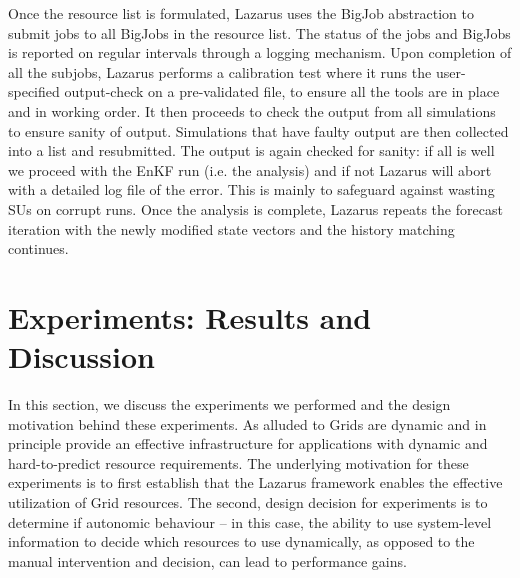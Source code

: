 \documentclass[conference,final]{IEEEtran}
\begin{document}
Once the resource list is formulated, Lazarus uses the BigJob
abstraction to submit jobs to all BigJobs in the resource list. The
status of the jobs and BigJobs is reported on regular intervals
through a logging mechanism. Upon completion of all the subjobs,
Lazarus performs a calibration test where it runs the user-specified
output-check on a pre-validated file, to ensure all the tools are in
place and in working order. It then proceeds to check the output from
all simulations to ensure sanity of output. Simulations that have
faulty output are then collected into a list and resubmitted. The
output is again checked for sanity: if all is well we proceed with the
EnKF run (i.e. the analysis) and if not Lazarus will abort with a
detailed log file of the error. This is mainly to safeguard against
wasting SUs on corrupt runs. Once the analysis is complete, Lazarus
repeats the forecast iteration with the newly modified state vectors
and the history matching continues.


\section{Experiments: Results and Discussion}

In this section, we discuss the experiments we performed and the
design motivation behind these experiments.  As alluded to Grids are
dynamic and in principle provide an effective infrastructure for
applications with dynamic and hard-to-predict resource requirements.
The underlying motivation for these experiments is to first establish
that the Lazarus framework enables the effective utilization of Grid
resources. The second, design decision for experiments is to determine
if autonomic behaviour -- in this case, the ability to use
system-level information to decide which resources to use dynamically,
as opposed to the manual intervention and decision, can lead to
performance gains.
\end{document}
